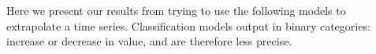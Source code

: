
Here we present our results from trying to use the following models to extrapolate a time series.
Classification models output in binary categories: increase or decrease in value, and are therefore less precise.













